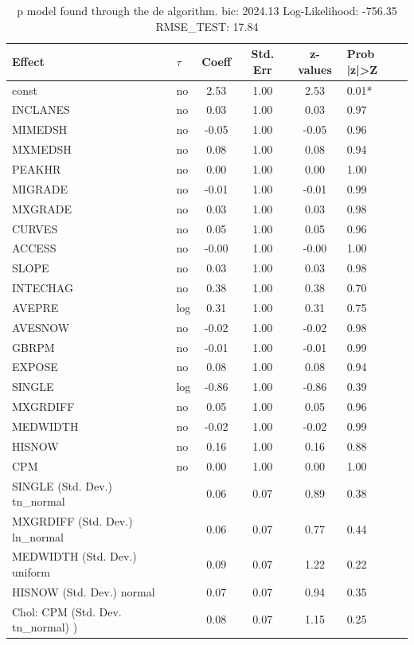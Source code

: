 \begin{table}
	\caption{p model found through the de algorithm. bic: 2024.13 Log-Likelihood: -756.35 RMSE_TEST: 17.84}
	\begin{center}
		\begin{tabular}{|l|l|c|c|c|l|}
			\hline
			Effect & $\tau$ & Coeff & Std. Err & z-values & Prob |z|>Z \\
			\hline
			const & no & 2.53 & 1.00 & 2.53 & 0.01* \\
			\hline
			INCLANES & no & 0.03 & 1.00 & 0.03 & 0.97 \\
			\hline
			MIMEDSH & no & -0.05 & 1.00 & -0.05 & 0.96 \\
			\hline
			MXMEDSH & no & 0.08 & 1.00 & 0.08 & 0.94 \\
			\hline
			PEAKHR & no & 0.00 & 1.00 & 0.00 & 1.00 \\
			\hline
			MIGRADE & no & -0.01 & 1.00 & -0.01 & 0.99 \\
			\hline
			MXGRADE & no & 0.03 & 1.00 & 0.03 & 0.98 \\
			\hline
			CURVES & no & 0.05 & 1.00 & 0.05 & 0.96 \\
			\hline
			ACCESS & no & -0.00 & 1.00 & -0.00 & 1.00 \\
			\hline
			SLOPE & no & 0.03 & 1.00 & 0.03 & 0.98 \\
			\hline
			INTECHAG & no & 0.38 & 1.00 & 0.38 & 0.70 \\
			\hline
			AVEPRE & log & 0.31 & 1.00 & 0.31 & 0.75 \\
			\hline
			AVESNOW & no & -0.02 & 1.00 & -0.02 & 0.98 \\
			\hline
			GBRPM & no & -0.01 & 1.00 & -0.01 & 0.99 \\
			\hline
			EXPOSE & no & 0.08 & 1.00 & 0.08 & 0.94 \\
			\hline
			SINGLE & log & -0.86 & 1.00 & -0.86 & 0.39 \\
			\hline
			MXGRDIFF & no & 0.05 & 1.00 & 0.05 & 0.96 \\
			\hline
			MEDWIDTH & no & -0.02 & 1.00 & -0.02 & 0.99 \\
			\hline
			HISNOW & no & 0.16 & 1.00 & 0.16 & 0.88 \\
			\hline
			CPM & no & 0.00 & 1.00 & 0.00 & 1.00 \\
			\hline
			SINGLE (Std. Dev.) tn_normal &  & 0.06 & 0.07 & 0.89 & 0.38 \\
			\hline
			MXGRDIFF (Std. Dev.) ln_normal &  & 0.06 & 0.07 & 0.77 & 0.44 \\
			\hline
			MEDWIDTH (Std. Dev.) uniform &  & 0.09 & 0.07 & 1.22 & 0.22 \\
			\hline
			HISNOW (Std. Dev.) normal &  & 0.07 & 0.07 & 0.94 & 0.35 \\
			\hline
			 Chol: CPM (Std. Dev. tn_normal) ) &  & 0.08 & 0.07 & 1.15 & 0.25 \\
			\hline
		\end{tabular}
	\end{center}
\end{table}